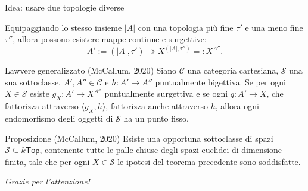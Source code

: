 \documentclass[italian,usepdftitle=false]{beamer}
\begin{document}
\begin{frame}{Idea: usare due topologie diverse}
  \small
  \raggedright
  Equipaggiando lo stesso insieme $|A|$ con una topologia più fine $\tau'$ e una
  meno fine $\tau''$, allora possono esistere mappe continue e surgettive:
  \[
    A' := (|A|,\tau') \twoheadrightarrow X^{(|A|,\tau'')} =: X^{A''}.
  \]

  \vspace{-2.1mm}
  \begin{block}{Lawvere generalizzato (McCallum, 2020)}
    \footnotesize
    Siano $\mathcal C$ una categoria cartesiana, $\mathcal S$ una sua sottoclasse, $A',A'' \in \mathcal C$ e $h:A'\to A''$ puntualmente bigettiva.
    Se per ogni $X\in\mathcal S$ esiste $g_X:A'\to X^{A''}$ puntualmente surgettiva e se ogni $q:A'\to X$, che fattorizza
    attraverso $\langle g_X,h\rangle$, fattorizza anche attraverso $h$, allora
    ogni endomorfismo degli oggetti di $\mathcal S$ ha un punto fisso.
  \end{block}

  \vspace{-2.1mm}
  {
  \begin{block}{Proposizione (McCallum, 2020)}
    \footnotesize
    Esiste una opportuna sottoclasse di spazi $\mathcal S\subseteq k\mathsf{Top}$, contenente tutte le
    palle chiuse degli spazi euclidei di dimensione finita, tale che per ogni $X\in\mathcal S$ le ipotesi del teorema precedente sono soddisfatte.
  \end{block}
  }
\end{frame}

\begingroup
  \begin{frame}[c]
    \centering
    {\Huge\textsl{Grazie per l'attenzione!}}
  \end{frame}
\endgroup
\end{document}

